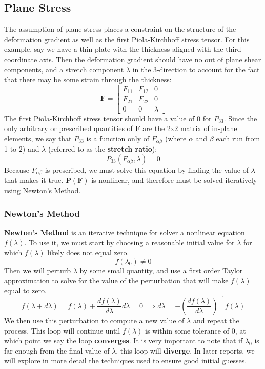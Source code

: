 \documentclass[]{spie}  %
\begin{document}
\subsection{Plane Stress}
The assumption of plane stress places a constraint on the structure of the deformation gradient as well as the first Piola-Kirchhoff stress tensor. For this example, say we have a thin plate with the thickness aligned with the third coordinate axis. Then the deformation gradient should have no out of plane shear components, and a stretch component $\lambda$ in the 3-direction to account for the fact that there may be some strain through the thickness:
\begin{equation}
\bm{F} = 
\begin{bmatrix}
F_{11} 	& F_{12} 	& 0 \\
F_{21} 	& F_{22} 	& 0 \\
0   	& 0			& \lambda	
\end{bmatrix}
\end{equation}
The first Piola-Kirchhoff stress tensor should have a value of 0 for $P_{33}$. Since the only arbitrary or prescribed quantities of $\bm{F}$ are the 2x2 matrix of in-plane elements, we say that $P_{33}$ is a function only of $F_{\alpha\beta}$ (where $\alpha$ and $\beta$ each run from 1 to 2) and $\lambda$ (referred to as the \textbf{stretch ratio}):
\begin{equation}
P_{33}(F_{\alpha\beta}, \lambda) = 0
\end{equation}  
Because $F_{\alpha\beta}$ is prescribed, we must solve this equation by finding the value of $\lambda$ that makes it true. $\bm{P}(\bm{F})$ is nonlinear, and therefore must be solved iteratively using Newton's Method. 

\subsubsection{Newton's Method}
\textbf{Newton's Method} is an iterative technique for solver a nonlinear equation $f(\lambda)$. To use it, we must start by choosing a reasonable initial value for $\lambda$ for which $f(\lambda)$ likely does not equal zero. 
\begin{equation}
f(\lambda_0) \neq 0
\end{equation}
Then we will perturb $\lambda$ by some small quantity, and use a first order Taylor approximation to solve for the value of the perturbation that will make $f(\lambda)$ equal to zero.
\begin{equation}
\label{eq: dlambda}
f(\lambda + d\lambda) = f(\lambda) + \frac{df(\lambda)}{d\lambda}d\lambda = 0 \implies d\lambda = -\left(\frac{df(\lambda)}{d\lambda}\right)^{-1} f(\lambda)
\end{equation}
We then use this perturbation to compute a new value of $\lambda$ and repeat the process. This loop will continue until $f(\lambda)$ is within some tolerance of 0, at which point we say the loop \textbf{converges}. It is very important to note that if $\lambda_0$ is far enough from the final value of $\lambda$, this loop will \textbf{diverge}. In later reports, we will explore in more detail the techniques used to ensure good initial guesses. 
\end{document}
